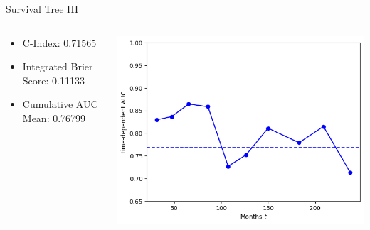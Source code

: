 \documentclass{beamer}
\begin{document}
\begin{frame}{Survival Tree III}
    \begin{columns}
        \begin{column}{0.49 \textwidth}
            \begin{itemize}
                \item C-Index: 0.71565
                \item Integrated Brier Score: 0.11133
                \item Cumulative AUC Mean: 0.76799
            \end{itemize}
        \end{column}
        \begin{column}{0.49 \textwidth}
            \centering
            \includegraphics[width = \textwidth]{images/st_auc.png}
        \end{column}
    \end{columns}
\end{frame}
\end{document}

